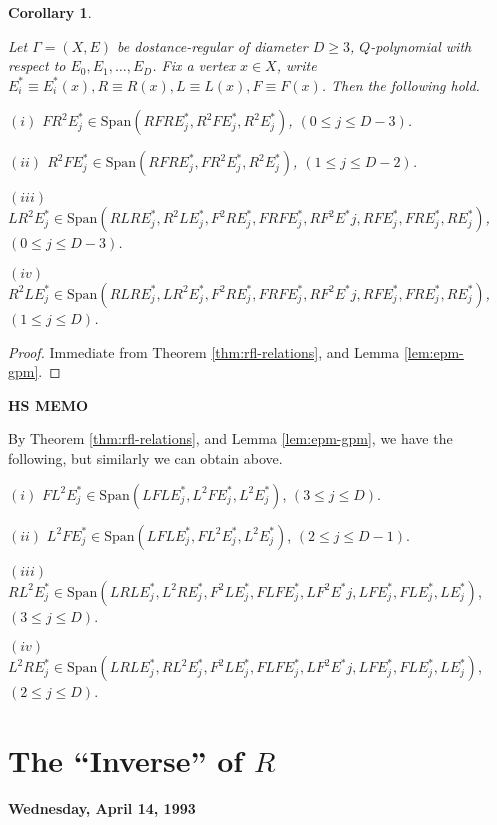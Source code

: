\documentclass[
]{book}
\newtheorem{corollary}{Corollary}[chapter]
\theoremstyle{definition}
\theoremstyle{definition}
\theoremstyle{definition}
\theoremstyle{definition}
\theoremstyle{remark}
\begin{document}
\begin{corollary}
\protect\hypertarget{cor:fr2lr2r2l}{}\label{cor:fr2lr2r2l}

Let \(\Gamma = (X, E)\) be dostance-regular of diameter \(D\geq 3\), \(Q\)-polynomial with respect to \(E_0, E_1, \ldots, E_D\). Fix a vertex \(x\in X\), write \(E^*_i \equiv E^*_i(x), R\equiv R(x), L\equiv L(x), F\equiv F(x)\).
Then the following hold.

\((i)\) \(FR^2E^*_j \in \mathrm{Span}(RFRE^*_j, R^2FE^*_j, R^2E^*_j)\), \((0\leq j\leq D-3)\).

\((ii)\) \(R^2FE^*_j \in \mathrm{Span}(RFRE^*_j, FR^2E^*_j, R^2E^*_j)\), \((1\leq j\leq D-2)\).

\((iii)\) \(LR^2E^*_j \in \mathrm{Span}(RLRE^*_j, R^2LE^*_j, F^2RE^*_j, FRFE^*_j, RF^2E^*j, RFE^*_j, FRE^*_j, RE^*_j)\), \((0\leq j\leq D-3)\).

\((iv)\) \(R^2LE^*_j \in \mathrm{Span}(RLRE^*_j, LR^2E^*_j, F^2RE^*_j, FRFE^*_j, RF^2E^*j, RFE^*_j, FRE^*_j, RE^*_j)\), \((1\leq j\leq D)\).

\end{corollary}

\begin{proof}
Immediate from Theorem \ref{thm:rfl-relations}, and Lemma \ref{lem:epm-gpm}.
\end{proof}

\textbf{HS MEMO}

By Theorem \ref{thm:rfl-relations}, and Lemma \ref{lem:epm-gpm}, we have the following, but similarly we can obtain above.

\((i)\) \(FL^2E^*_j \in \mathrm{Span}(LFLE^*_j, L^2FE^*_j, L^2E^*_j)\), \((3\leq j\leq D)\).

\((ii)\) \(L^2FE^*_j \in \mathrm{Span}(LFLE^*_j, FL^2E^*_j, L^2E^*_j)\), \((2\leq j\leq D-1)\).

\((iii)\) \(RL^2E^*_j \in \mathrm{Span}(LRLE^*_j, L^2RE^*_j, F^2LE^*_j, FLFE^*_j, LF^2E^*j, LFE^*_j, FLE^*_j, LE^*_j)\), \((3\leq j\leq D)\).

\((iv)\) \(L^2RE^*_j \in \mathrm{Span}(LRLE^*_j, RL^2E^*_j, F^2LE^*_j, FLFE^*_j, LF^2E^*j, LFE^*_j, FLE^*_j, LE^*_j)\), \((2\leq j\leq D)\).

\hypertarget{lec31}{%
\chapter{\texorpdfstring{The ``Inverse'' of \(R\)}{The ``Inverse'' of R}}\label{lec31}}

\textbf{Wednesday, April 14, 1993}
\end{document}
